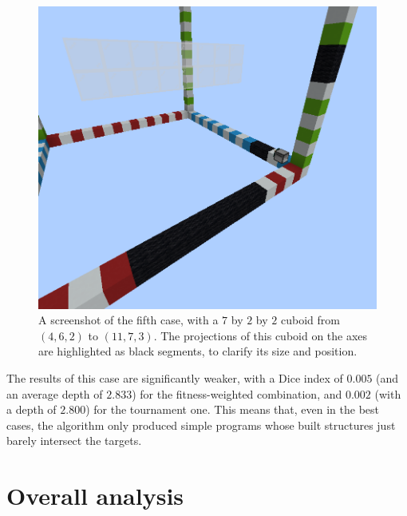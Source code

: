 \documentclass{report}
\begin{document}
\begin{figure}[H]
    \centering
    \includegraphics[scale=0.3]{minecraft6}
    \caption{A screenshot of the fifth case, with a $7$ by $2$ by $2$ cuboid from $(4, 6, 2)$ to $(11, 7, 3)$. The projections of this cuboid on the axes are highlighted as black segments, to clarify its size and position.}
    \label{fig:case5_minecraft}
\end{figure}

The results of this case are significantly weaker, with a Dice index of $0.005$ (and an average depth of $2.833$) for the fitness-weighted combination, and $0.002$ (with a depth of $2.800$) for the tournament one. This means that, even in the best cases, the algorithm only produced simple programs whose built structures just barely intersect the targets.

\section{Overall analysis}
\end{document}
